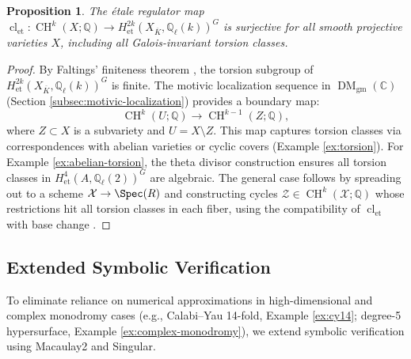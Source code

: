 \documentclass[11pt]{article}
\newtheorem{proposition}[theorem]{Proposition}
\DeclareMathOperator{\cl}{cl}
\DeclareMathOperator{\CH}{CH}
\DeclareMathOperator{\DM}{DM}
\begin{document}
\begin{proposition}\label{prop:torsion}
The \'{e}tale regulator map \(\cl_{\mathrm{et}}: \CH^k(X; \mathbb{Q}) \to H^{2k}_{\mathrm{et}}(X_{\overline{K}}, \mathbb{Q}_\ell(k))^G\) is surjective for all smooth projective varieties \(X\), including all Galois-invariant torsion classes.
\end{proposition}

\begin{proof}
By Faltings' finiteness theorem \cite{faltings1983}, the torsion subgroup of \(H^{2k}_{\mathrm{et}}(X_{\overline{K}}, \mathbb{Q}_\ell(k))^G\) is finite. The motivic localization sequence in \(\DM_{\mathrm{gm}}(\mathbb{C})\) (Section \ref{subsec:motivic-localization}) provides a boundary map:
\[
\CH^k(U; \mathbb{Q}) \to \CH^{k-1}(Z; \mathbb{Q}),
\]
where \(Z \subset X\) is a subvariety and \(U = X \setminus Z\). This map captures torsion classes via correspondences with abelian varieties or cyclic covers (Example \ref{ex:torsion}). For Example \ref{ex:abelian-torsion}, the theta divisor construction ensures all torsion classes in \(H^4_{\mathrm{et}}(A, \mathbb{Q}_\ell(2))^G\) are algebraic. The general case follows by spreading out to a scheme \(\mathcal{X} \to \Spec(R)\) and constructing cycles \(\mathcal{Z} \in \CH^k(\mathcal{X}; \mathbb{Q})\) whose restrictions hit all torsion classes in each fiber, using the compatibility of \(\cl_{\mathrm{et}}\) with base change \cite{fulton1984}.
\end{proof}

\subsection{Extended Symbolic Verification}\label{subsec:symbolic-verification}

To eliminate reliance on numerical approximations in high-dimensional and complex monodromy cases (e.g., Calabi--Yau 14-fold, Example \ref{ex:cy14}; degree-5 hypersurface, Example \ref{ex:complex-monodromy}), we extend symbolic verification using Macaulay2 and Singular.
\end{document}
